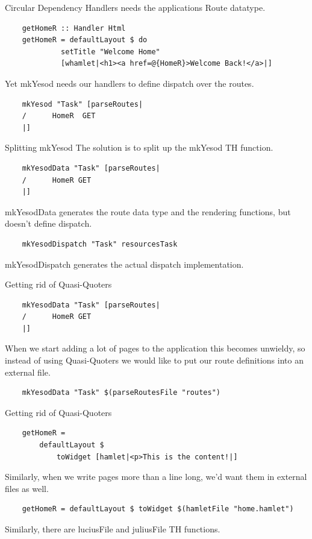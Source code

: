 \documentclass[pdf]{beamer}
\begin{document}
\begin{frame}[fragile]{Circular Dependency}
  Handlers needs the applications Route datatype.
  \begin{verbatim}
    getHomeR :: Handler Html
    getHomeR = defaultLayout $ do
             setTitle "Welcome Home"
             [whamlet|<h1><a href=@{HomeR}>Welcome Back!</a>|]
  \end{verbatim}
  \pause
  Yet mkYesod needs our handlers to define dispatch over the routes.
  \begin{verbatim}
    mkYesod "Task" [parseRoutes|
    /      HomeR  GET
    |]
  \end{verbatim}
\end{frame}

\begin{frame}[fragile]{Splitting mkYesod}
  The solution is to split up the mkYesod TH function.\\
  \pause
  \begin{verbatim}
    mkYesodData "Task" [parseRoutes|
    /      HomeR GET
    |]
  \end{verbatim}
  mkYesodData generates the route data type and the rendering
  functions, but doesn't define dispatch.\\
  \pause
  \begin{verbatim}
    mkYesodDispatch "Task" resourcesTask
  \end{verbatim}
  mkYesodDispatch generates the actual dispatch implementation.
\end{frame}

\begin{frame}[fragile]{Getting rid of Quasi-Quoters}
  \begin{verbatim}
    mkYesodData "Task" [parseRoutes|
    /      HomeR GET
    |]
  \end{verbatim}
  When we start adding a lot of pages to the application this becomes
  unwieldy, so instead of using Quasi-Quoters we would like to put our
  route definitions into an external file.\\
  \pause
  \begin{verbatim}
    mkYesodData "Task" $(parseRoutesFile "routes")
  \end{verbatim}
\end{frame}

\begin{frame}[fragile]{Getting rid of Quasi-Quoters}
  \begin{verbatim}
    getHomeR =
        defaultLayout $
            toWidget [hamlet|<p>This is the content!|]
  \end{verbatim}
  Similarly, when we write pages more than a line long, we'd want them
  in external files as well.\\
  \pause
  \begin{verbatim}
    getHomeR = defaultLayout $ toWidget $(hamletFile "home.hamlet")
  \end{verbatim}
  \pause
  Similarly, there are luciusFile and juliusFile TH functions.
\end{frame}
\end{document}

